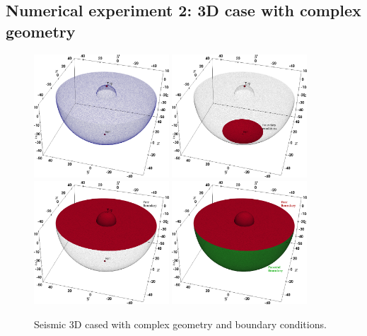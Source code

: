 \subsection{Numerical experiment 2: 3D case with complex geometry}

\begin{figure}
    \centering
    \includegraphics[width=0.45\textwidth]{./Images/top-bot.png}        \includegraphics[width=0.45\textwidth]{./Images/top-bot-bc.png}\\
    \includegraphics[width=0.45\textwidth]{./Images/top-bot-bc1.png}        \includegraphics[width=0.45\textwidth]{./Images/top-bot-bc2.png}\\
    \caption{Seismic 3D cased with complex geometry and boundary conditions.}
    \label{fig:soilsemiCastemPSD3D}
\end{figure}

